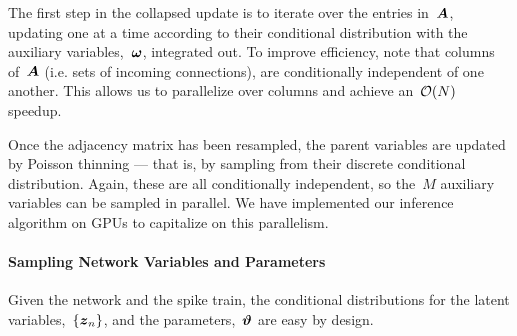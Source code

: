 The first step in the collapsed update is to iterate over the
entries in~$\boldsymbol{A}$, updating one at a time according to their
conditional distribution with the auxiliary variables,~$\boldsymbol{\omega}$,
integrated out. To improve efficiency, note that columns of~$\boldsymbol{A}$
(i.e. sets of incoming connections), are conditionally
independent of one another. This allows us to parallelize over
columns and achieve an~$\mathcal{O}(N)$ speedup.

Once the adjacency matrix has been resampled, the parent variables
are updated by Poisson thinning --- that is, by sampling from their
discrete conditional distribution. Again, these are all conditionally
independent, so the~$M$ auxiliary variables can be sampled in parallel.
We have implemented our inference algorithm on GPUs to capitalize
on this parallelism.

\paragraph{Sampling Network Variables and Parameters}
Given the network and the spike train, the conditional distributions 
for the latent variables,~$\{\boldsymbol{z}_n\}$, and the parameters,~$\boldsymbol{\vartheta}$ 
are easy by design.

